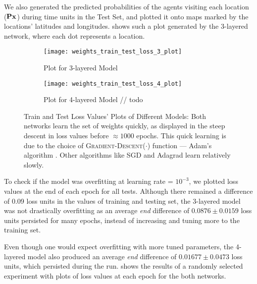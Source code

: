 We also generated the predicted probabilities of the agents visiting each location ($\mathbf{P}\mathbf{x}$) during time units in the Test Set, and plotted it onto maps marked by the locations' latitudes and longitudes.  shows such a plot generated by the 3-layered network, where each dot represents a location.
\begin{figure}[!htbp]
    \centering
    \begin{subfigure}{.49\textwidth}
        \centering
        \texttt{[image: weights\_train\_test\_loss\_3\_plot]}
        \caption{Plot for 3-layered Model}
        \label{fig:Plot for 3-layered Model}
    \end{subfigure}
    \begin{subfigure}{.49\textwidth}
        \centering
        \texttt{[image: weights\_train\_test\_loss\_4\_plot]}
        \caption{Plot for 4-layered Model // todo}
        \label{fig:Plot for 4-layered Model}
    \end{subfigure}
    \caption[Train and Test Loss Values' Plots of Different Models]{Train and Test Loss Values' Plots of Different Models: Both networks learn the set of weights quickly, as displayed in the steep descent in loss values before $\approx 1000$ epochs. This quick learning is due to the choice of \textsc{Gradient-Descent}($\cdot$) function --- Adam's algorithm \cite{Adam}. Other algorithms like SGD \cite{SGD} and Adagrad \cite{Adagrad} learn relatively slowly.}
    \label{fig:Train & Test Loss Values' Plots of Different Models}
\end{figure}

To check if the model was overfitting at learning rate = $10^{-3}$, we plotted loss values at the end of each epoch for all tests. Although there remained a difference of 0.09 loss units in the values of training and testing set, the 3-layered model was not drastically overfitting as an average \textit{end} difference of $0.0876 \pm 0.0159$ loss units persisted for many epochs, instead of increasing and tuning more to the training set. 

Even though one would expect overfitting with more tuned parameters, the 4-layered model also  produced an average \textit{end} difference of $0.01677 \pm 0.0473$ loss units, which persisted during the run.  shows the results of a randomly selected experiment with plots of loss values at each epoch for the both networks.

